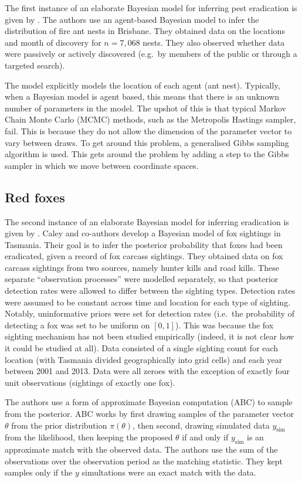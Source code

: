 \documentclass[
  oneside]{book}
\begin{document}
The first instance of an elaborate Bayesian model for inferring pest eradication is given by \citet{keith2013}. The authors use an agent-based Bayesian model to infer the distribution of fire ant nests in Brisbane. They obtained data on the locations and month of discovery for \(n = 7{,}068\) nests. They also observed whether data were passively or actively discovered (e.g.~by members of the public or through a targeted search).

The model explicitly models the location of each agent (ant nest). Typically, when a Bayesian model is agent based, this means that there is an unknown number of parameters in the model. The upshot of this is that typical Markov Chain Monte Carlo (MCMC) methods, such as the Metropolis Hastings sampler, fail. This is because they do not allow the dimension of the parameter vector to vary between draws. To get around this problem, a generalised Gibbs sampling algorithm is used. This gets around the problem by adding a step to the Gibbs sampler in which we move between coordinate spaces.

\hypertarget{red-foxes}{%
\subsection{Red foxes}\label{red-foxes}}

The second instance of an elaborate Bayesian model for inferring eradication is given by \citet{caley2015}. Caley and co-authors develop a Bayesian model of fox sightings in Tasmania. Their goal is to infer the posterior probability that foxes had been eradicated, given a record of fox carcass sightings. They obtained data on fox carcass sightings from two sources, namely hunter kills and road kills. These separate ``observation processes'' were modelled separately, so that posterior detection rates were allowed to differ between the sighting types. Detection rates were assumed to be constant across time and location for each type of sighting. Notably, uninformative priors were set for detection rates (i.e.~the probability of detecting a fox was set to be uniform on \([0, 1]\)). This was because the fox sighting mechanism has not been studied empirically (indeed, it is not clear how it could be studied at all). Data consisted of a single sighting count for each location (with Tasmania divided geographically into grid cells) and each year between 2001 and 2013. Data were all zeroes with the exception of exactly four unit observations (sightings of exactly one fox).

The authors use a form of approximate Bayesian computation (ABC) to sample from the posterior. ABC works by first drawing samples of the parameter vector \(\theta\) from the prior distribution \(\pi(\theta)\), then second, drawing simulated data \(y_{\text{sim}}\) from the likelihood, then keeping the proposed \(\theta\) if and only if \(y_{\text{sim}}\) is an approximate match with the observed data. The authors use the sum of the observations over the observation period as the matching statistic. They kept samples only if the \(y\) simultations were an exact match with the data.
\end{document}
